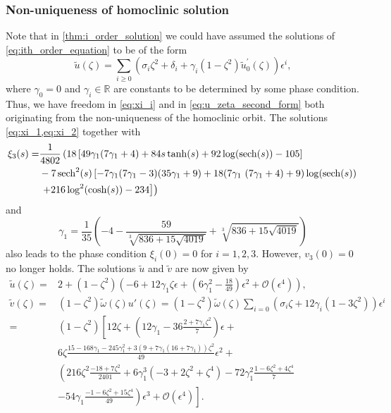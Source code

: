 \subsubsection{Non-uniqueness of homoclinic solution}
\label{sec:phase_condition}
Note that in \cref{thm:i_order_solution} we could have assumed the solutions of
\cref{eq:ith_order_equation} to be of the form
\begin{equation}
    \label{eq:u_zeta_second_form}
    \tilde u(\zeta)  = \sum_{i\geq 0} \left(\sigma_i \zeta^2 + \delta_i + \gamma_i (1-\zeta^2)
    \tilde u_0^\prime(\zeta) \right) \epsilon^i,
\end{equation}
where $\gamma_0=0$ and $\gamma_i\in\mathbb{R}$ are constants to
be determined by some phase condition. Thus, we have freedom in \cref{eq:xi_i}
and in \cref{eq:u_zeta_second_form} both originating from the non-uniqueness
of the homoclinic orbit. The solutions \cref{eq:xi_1,eq:xi_2} together with
\begin{align*}
    \xi_3(s) =&{}
    \frac{1}{4802} \left(18 \left[49 \gamma_1 (7 \gamma_1+4)+84 s \tanh (s)+92 \log
        (\operatorname{sech}(s))-105\right] \right. \\
        & -7 \operatorname{sech}^2(s) \left[-7 \gamma_1 (7 \gamma_1-3) (35 \gamma_1+9)+18 (7 \gamma_1 \
(7 \gamma_1+4)+9) \log (\operatorname{sech}(s)) \right. \\
        & \left.\left. +216 \log ^2(\cosh (s))-234\right] \right)
\end{align*}
and
\begin{equation*}
    \gamma_1 = \frac{1}{35} \left(-4-\frac{59}{\sqrt[3]{836+15
                \sqrt{4019}}}+\sqrt[3]{836+15 \sqrt{4019}}\right)
\end{equation*}
also leads to the phase condition $\xi_i(0)=0$ for $i=1,2,3$. However,
$v_3(0)=0$ no longer holds. The solutions $\tilde u$ and $\tilde v$ are now
given by
\begin{align*}
\tilde{u}(\zeta) 
={}& 2 + \left(1-\zeta^2\right) \left( -6 + 12 \gamma_1 \zeta  \epsilon
    + \left(6 \gamma_1^2-\frac{18}{49}\right)\epsilon^2 
    + \mathcal{O}(\epsilon^4) \right), \\
\tilde v(\zeta) 
    ={}& (1-\zeta^2) \tilde \omega (\zeta) u'(\zeta) 
    = (1-\zeta^2) \tilde \omega(\zeta) \sum_{i=0} \left( \sigma_i \zeta   +
         12 \gamma_i \left( 1 - 3 \zeta^2 \right) \right) \epsilon^i \\
	  ={}& (1-\zeta^2)\left[12\zeta + 
        \left(12\gamma_1 - 36\frac{2 + 7 \gamma_1\zeta^2}{7}\right) \epsilon +
        \nonumber \right.\\
       & 6\zeta\frac{15 - 168\gamma_1 - 245\gamma_1^2 + 
         3(9 + 7 \gamma_1(16 + 7 \gamma_1))\zeta^2}{49} \epsilon^2 + \nonumber \\
     {}& \left( 216\zeta^2\frac{-18 + 7\zeta^2}{2401} 
        + 6\gamma_1^3(-3 + 2\zeta^2 + \zeta^4) -
      72\gamma_1^2\frac{1 - 6\zeta^2 + 4\zeta^4}7  \right. \nonumber \\
     {}& \left. \left. - 54 \gamma_1\frac{-1 - 6\zeta^2 + 15\zeta^4}{49}
        \right)\epsilon^3 
        + \mathcal{O}(\epsilon^4) \right] \nonumber.
\end{align*}
